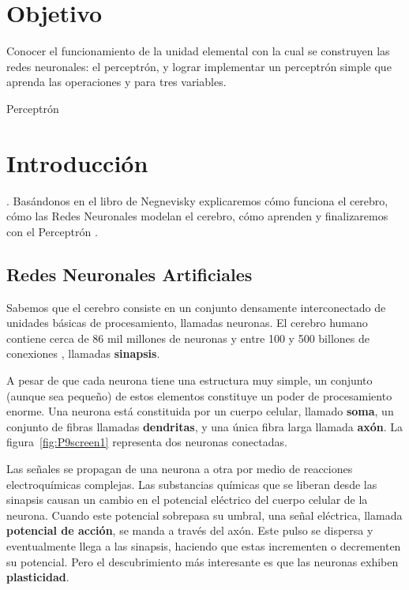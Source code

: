 


\section{Objetivo}

Conocer el funcionamiento de la unidad elemental con la cual se construyen las redes neuronales: el perceptrón, y lograr implementar un perceptrón simple que aprenda las operaciones  y  para tres variables.

\begin{auxcode}
 \caption{Perceptrón}
 \centering
\end{auxcode}

\section{Introducci\'on}

 \parencite[166]{Nengnevitsky2005}. Basándonos en el libro de Negnevisky explicaremos cómo funciona el cerebro, cómo las Redes Neuronales modelan el cerebro, cómo aprenden y finalizaremos con el Perceptrón \parencite[cap. 6]{Nengnevitsky2005}.


\subsection{Redes Neuronales Artificiales}

Sabemos que el cerebro consiste en un conjunto densamente interconectado de unidades básicas de procesamiento, llamadas neuronas. El cerebro humano contiene cerca de 86 mil millones de neuronas \parencite{Herculano-Houzel2009} y entre 100 y 500 billones de conexiones \parencite{Drachman2005}, llamadas \textbf{sinapsis}.\par

A pesar de que cada neurona tiene una estructura muy simple, un conjunto (aunque sea pequeño) de estos elementos constituye un poder de procesamiento enorme. Una neurona está constituida por un cuerpo celular, llamado \textbf{soma}, un conjunto de fibras llamadas \textbf{dendritas}, y una única fibra larga llamada \textbf{axón}. La figura~\ref{fig:P9screen1} representa dos neuronas conectadas.

Las señales se propagan de una neurona a otra por medio de reacciones electroquímicas complejas. Las substancias químicas que se liberan desde las sinapsis causan un cambio en el potencial eléctrico del cuerpo celular de la neurona. Cuando este potencial sobrepasa su umbral, una señal eléctrica, llamada \textbf{potencial de acción}, se manda a través del axón. Este pulso se dispersa y eventualmente llega a las sinapsis, haciendo que estas incrementen o decrementen su potencial. Pero el descubrimiento más interesante es que las neuronas exhiben \textbf{plasticidad}.\par

